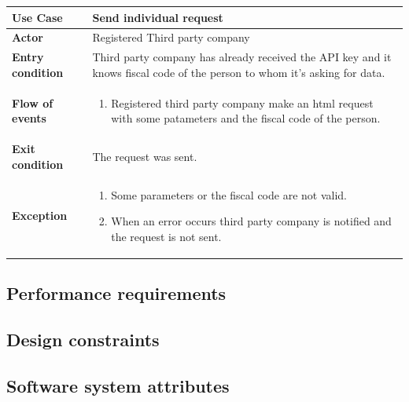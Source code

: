 \documentclass[../main.tex]{subfiles}
\begin{document}
	\vspace*{3cm}
	\begin{center}
		\begin{tabular}{p{3cm}p{8.28cm}}
			\hline
			\textbf{Use Case} & Send individual request\\
			\hline
			\textbf{Actor} & Registered Third party company\\
			\hline
			\textbf{Entry condition} & Third party company has already received the API key and it knows fiscal code of the person to whom it's asking for data.\\
			\hline
			\textbf{Flow of events} & \begin{enumerate}
				\linespread{0}\item Registered third party company make an html request with some patameters and the fiscal code of the person.
			\end{enumerate}\\
			\hline
			\textbf{Exit condition} & The request was sent.\\
			\hline
			\textbf{Exception} & \begin{enumerate}
				\linespread{0}\item Some parameters or the fiscal code are not valid.
				\linespread{0}\item When an error occurs third party company is notified and the request is not sent.
			\end{enumerate}\\
			\hline
		\end{tabular}
	\end{center}
\subsection{Performance requirements}
\subsection{Design constraints}
\subsection{Software system attributes}
\end{document}
